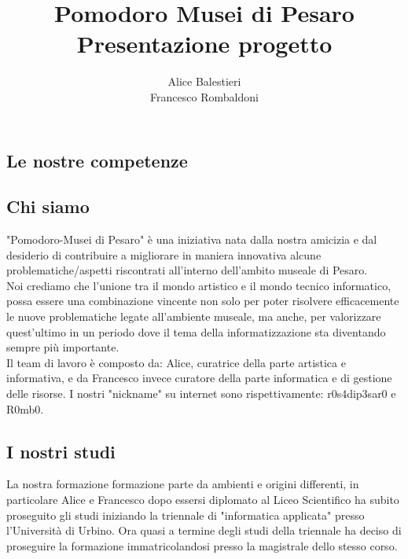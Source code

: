 \documentclass[hidelinks,12pt,a4paper]{article}
\begin{document}
	\begin{flushleft}
		
		\title{\textbf{Pomodoro Musei di Pesaro}\\\small{Presentazione progetto}}
		\author{Alice Balestieri\\ Francesco Rombaldoni}
		\date{}
		
		\maketitle
		
		\setcounter{page}{1}
		\newpage
		\tableofcontents
		\newpage
		
		\section{Le nostre competenze}
			\subsection{Chi siamo}
			"Pomodoro-Musei di Pesaro" è una iniziativa nata dalla nostra amicizia e dal desiderio di contribuire a migliorare in maniera innovativa alcune problematiche/aspetti riscontrati all'interno dell'ambito museale di Pesaro.\\
			Noi crediamo che l'unione tra il mondo artistico e il mondo tecnico informatico, possa essere una combinazione vincente non solo per poter risolvere efficacemente le nuove problematiche legate all'ambiente museale, ma anche, per valorizzare quest'ultimo in un periodo dove il tema della informatizzazione sta diventando sempre più importante.\\
			Il team di lavoro è composto da: Alice, curatrice della parte artistica e informativa, e da Francesco invece curatore della parte informatica e di gestione delle risorse. I nostri "nickname" su internet sono rispettivamente: r0s4dip3sar0 e R0mb0. 
			
			
			\subsection{I nostri studi}
			La nostra formazione formazione parte da ambienti e origini differenti, in particolare Alice
			e Francesco dopo essersi diplomato al Liceo Scientifico ha subito proseguito gli studi iniziando la triennale di "informatica applicata" presso l'Università di Urbino. Ora quasi a termine degli studi della triennale ha deciso di proseguire la formazione immatricolandosi presso la magistrale dello stesso corso. 
			

\end{flushleft}
\end{document}
